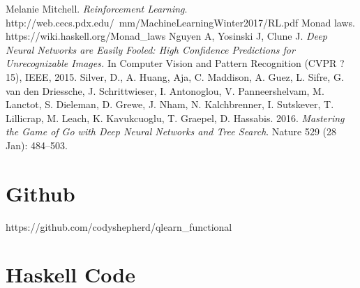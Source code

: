 \documentclass[12pt,a4paper]{article}
\begin{document}
	\pagebreak
	\begin{thebibliography}{9}
		Melanie  Mitchell.
		\textit{Reinforcement Learning}.
		http://web.cecs.pdx.edu/~mm/MachineLearningWinter2017/RL.pdf
		Monad laws.
		https://wiki.haskell.org/Monad\_laws
		Nguyen A, Yosinski J, Clune J. 
		\textit{Deep Neural Networks are Easily Fooled: High Confidence Predictions
for Unrecognizable Images.}
		In Computer Vision and Pattern Recognition (CVPR ?15), IEEE, 2015.
		Silver, D., A. Huang, Aja, C. Maddison, A. Guez, L. Sifre, G. van den Driessche, J. Schrittwieser, I. Antonoglou, V. Panneershelvam, M. Lanctot, S. Dieleman, D. Grewe, J. Nham, N. Kalchbrenner, I. Sutskever, T. Lillicrap, M. Leach, K. Kavukcuoglu, T. Graepel, D. Hassabis. 2016. \textit{Mastering the Game of Go with Deep Neural Networks and Tree Search}. Nature 529 (28 Jan): 484--503.
	\end{thebibliography}
	
	\pagebreak
	\appendix
	\section{Github}
	
	https://github.com/codyshepherd/qlearn\_functional
	
	\section{Haskell Code}
	
\end{document}
